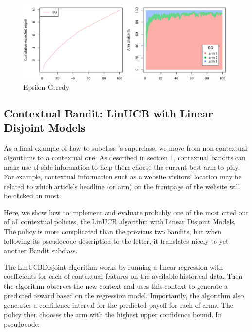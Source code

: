 \documentclass{jss}\usepackage[]{graphicx}\usepackage[]{color}
\makeatletter
\def\maxwidth{ %
  \ifdim\Gin@nat@width>\linewidth
    \linewidth
  \else
    \Gin@nat@width
  \fi
}
\newenvironment{knitrout}{}{} %
\makeatother
\begin{document}
\begin{center}
\begin{knitrout}
\color{fgcolor}\begin{figure}[H]
\includegraphics[width=\maxwidth,]{fig/egpolicy-1} \caption[Epsilon Greedy]{Epsilon Greedy}\label{fig:egpolicy}
\end{figure}


\end{knitrout}
\end{center}

\subsection{Contextual Bandit: LinUCB with Linear Disjoint Models}

As a final example of how to subclass 's  superclass, we move from non-contextual algorithms to a contextual one. As described in section 1, contextual bandits can make use of side information to help them choose the current best arm to play. For example, contextual information such as a website visitors' location may be related to which article's headline (or arm) on the frontpage of the website will be clicked on most.

Here, we show how to implement and evaluate probably one of the most cited out of all contextual policies, the LinUCB algorithm with Linear Disjoint Models. The policy is more complicated than the previous two bandits, but when following its pseudocode description to the letter, it translates nicely to yet another Bandit subclass.

The LinUCBDisjoint algorithm works by running a linear regression with coefficients for each of  contextual features on the available historical data. Then the algorithm observes the new context and uses this context to generate a predicted reward based on the regression model. Importantly, the algorithm also generates a confidence interval for the predicted payoff for each of  arms. The policy then chooses the arm with the highest upper confidence bound. In pseudocode:
\end{document}
